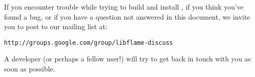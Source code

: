
If you encounter trouble while trying to build and install \libflamens, if
you think you've found a bug, or if you have a question not answered in
this document, we invite you to post to our mailing list at:
\begin{Verbatim}[frame=none,framesep=2.5mm,xleftmargin=5mm,commandchars=\\\{\},fontsize=\normalsize]
http://groups.google.com/group/libflame-discuss
\end{Verbatim}
A \libflame developer (or perhaps a fellow user!) will try to get back in
touch with you as soon as possible.

